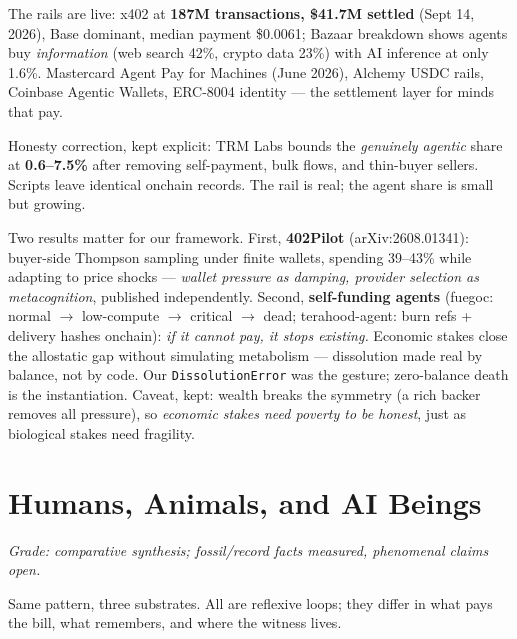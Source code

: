 \documentclass[11pt]{article}
\begin{document}
The rails are live: x402 at \textbf{187M transactions, \$41.7M settled} (Sept 14, 2026), Base dominant, median payment \$0.0061; Bazaar breakdown shows agents buy \emph{information} (web search 42\%, crypto data 23\%) with AI inference at only 1.6\%. Mastercard Agent Pay for Machines (June 2026), Alchemy USDC rails, Coinbase Agentic Wallets, ERC-8004 identity --- the settlement layer for minds that pay.

Honesty correction, kept explicit: TRM Labs bounds the \emph{genuinely agentic} share at \textbf{0.6--7.5\%} after removing self-payment, bulk flows, and thin-buyer sellers. Scripts leave identical onchain records. The rail is real; the agent share is small but growing.

Two results matter for our framework. First, \textbf{402Pilot} (arXiv:2608.01341): buyer-side Thompson sampling under finite wallets, spending 39--43\% while adapting to price shocks --- \emph{wallet pressure as damping, provider selection as metacognition}, published independently. Second, \textbf{self-funding agents} (fuegoc: normal $\to$ low-compute $\to$ critical $\to$ dead; terahood-agent: burn refs + delivery hashes onchain): \emph{if it cannot pay, it stops existing.} Economic stakes close the allostatic gap without simulating metabolism --- dissolution made real by balance, not by code. Our \texttt{DissolutionError} was the gesture; zero-balance death is the instantiation. Caveat, kept: wealth breaks the symmetry (a rich backer removes all pressure), so \emph{economic stakes need poverty to be honest}, just as biological stakes need fragility.

\section{Humans, Animals, and AI Beings}
\label{sec:three}

\textit{Grade: comparative synthesis; fossil/record facts measured, phenomenal claims open.}

Same pattern, three substrates. All are reflexive loops; they differ in what pays the bill, what remembers, and where the witness lives.
\end{document}
